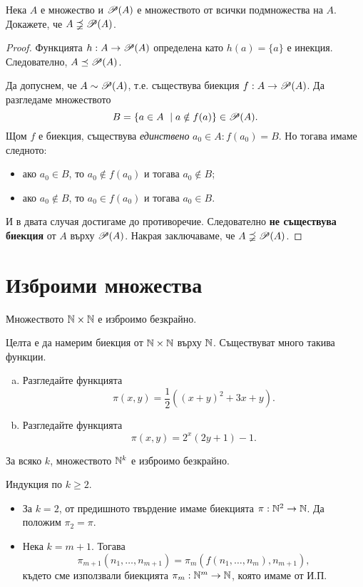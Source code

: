 \begin{thm}
  Нека $A$ е множество и $\mathscr{P}(A)$ е множеството от всички подмножества на $A$.
  Докажете, че $A \precneqq \mathscr{P}(A)$.
\end{thm}
\begin{proof}
  Функцията $h:A \to \mathscr{P}(A)$ определена като $h(a) = \{a\}$ е инекция.
  Следователно, $A \preceq \mathscr{P}(A)$.

  Да допуснем, че $A \sim \mathscr{P}(A)$, т.е. 
  съществува биекция $f:A\rightarrow \mathscr{P}(A)$.
  Да разгледаме множеството \[B=\{a\in A\ \mid a\notin f(a)\}\in\mathscr{P}(A).\]
  Щом $f$ е биекция, съществува {\em единствено} $a_0\in A: f(a_0) = B$.
  Но тогава имаме следното:
  \begin{itemize}
  \item
    ако $a_0\in B$, то $a_0 \not\in f(a_0)$ и тогава $a_0\not\in B$;
  \item
    ако $a_0\not\in B$, то $a_0 \in f(a_0)$ и тогава $a_0\in B$.
  \end{itemize}
  И в двата случая достигаме до противоречие.
  Следователно {\bf не съществува биекция} от $A$ върху $\mathscr{P}(A)$.
  Накрая заключаваме, че $A \precneqq \mathscr{P}(A)$.
\end{proof}

\section{Изброими множества}

\begin{prop}
  Множеството $\mathbb{N}\times\mathbb{N}$ е изброимо безкрайно.
\end{prop}
\begin{hint}
  Целта е да намерим биекция от $\mathbb{N}\times \mathbb{N}$ върху $\mathbb{N}$.
  Съществуват много такива функции.
  \begin{enumerate}[a)]
  \item 
    Разгледайте функцията 
    \[\pi(x,y) = \frac{1}{2}((x+y)^2+3x+y).\]
  \item
    Разгледайте функцията
    \[\pi(x,y) = 2^x(2y+1)-1.\]
  \end{enumerate}
\end{hint}

\begin{prop}
  \label{pr:pi-k}
  За всяко $k$, множеството $\mathbb{N}^k$ е изброимо безкрайно.
\end{prop}
\begin{hint}
  Индукция по $k \geq 2$.
  \begin{itemize}
  \item 
    За $k = 2$, от предишното твърдение имаме биекцията $\pi:\mathbb{N}^2 \to \mathbb{N}$.
    Да положим $\pi_2 = \pi$.
  \item
    Нека $k = m+1$.
    Тогава \[\pi_{m+1}(n_1,\dots,n_{m+1}) = \pi_m(f(n_1,\dots,n_m),n_{m+1}),\]
    където сме използвали биекцията $\pi_m:\mathbb{N}^m \to \mathbb{N}$, която имаме от И.П.
  \end{itemize}
\end{hint}

